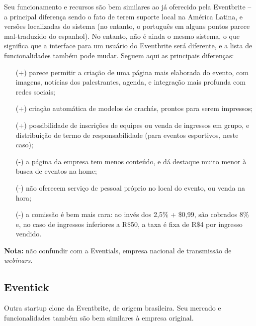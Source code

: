 \documentclass[12pt,a4paper,twoside,hyphens,english,brazil]{abntex2}
\begin{document}
Seu funcionamento e recursos são bem similares ao já oferecido pela Eventbrite -- a principal diferença sendo o fato de terem suporte local na América Latina, e versões localizadas do sistema (no entanto, o português em alguns pontos parece mal-traduzido do espanhol). No entanto, não é ainda o mesmo sistema, o que significa que a interface para um usuário do Eventbrite será diferente, e a lista de funcionalidades também pode mudar. Seguem aqui as principais diferenças:
\begin{itemize}[itemsep=-0.5ex]
	\item[(+)] parece permitir a criação de uma página mais elaborada do evento, com imagens, notícias dos palestrantes, agenda, e integração mais profunda com redes sociais;
	\item[(+)] criação automática de modelos de crachás, prontos para serem impressos;
	\item[(+)] possibilidade de inscrições de equipes ou venda de ingressos em grupo, e distribuição de termo de responsabilidade (para eventos esportivos, neste caso);
	\item[(-)] a página da empresa tem menos conteúdo, e dá destaque muito menor à busca de eventos na home;
	\item[(-)] não oferecem serviço de pessoal próprio no local do evento, ou venda na hora;
	\item[(-)] a comissão é bem mais cara: ao invés dos 2,5\% + \$0,99, são cobrados 8\% e, no caso de ingressos inferiores a R\$50, a taxa é fixa de R\$4 por ingresso vendido.
\end{itemize}

\begin{framed}
	\textbf{Nota:} não confundir com a Eventials, empresa nacional de transmissão de \emph{webinars}.
\end{framed}

\subsection{Eventick}
Outra startup clone da Eventbrite, de origem brasileira. Seu mercado e funcionalidades também são bem similares à empresa original.
\end{document}
